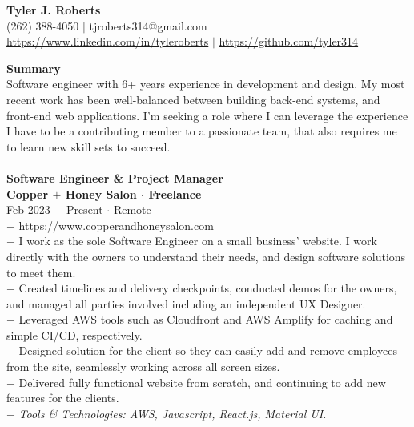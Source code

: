 \documentclass{resume}
\begin{document}
\begin{center}
{\LARGE \bf Tyler J. Roberts} \\[1mm]
\footnotesize
(262) 388-4050 $|$
tjroberts314@gmail.com \\[1mm]
\href{https://www.linkedin.com/in/tyleroberts}{https://www.linkedin.com/in/tyleroberts} $|$
\href{https://github.com/tyler314}{https://github.com/tyler314}
\end{center}
\begin{flushleft}

{\textbf{\large Summary}} \\
{
\footnotesize
\tab Software engineer with 6+ years experience in  development and design. My most recent work has been well-balanced between building back-end systems, and front-end  web applications. I'm seeking a role where I can leverage the experience I have to be a contributing member to a passionate team, that also requires me to learn new skill sets to succeed.
\\[4mm]
}
\\[2mm]

\normalsize{\bf Software Engineer \& Project Manager}\\
\footnotesize{\bf Copper $+$ Honey Salon $\cdot$ Freelance}\\
\footnotesize{Feb 2023 $-$ Present $\cdot$ Remote}\\[1mm]
{\scriptsize
	$-$ https://www.copperandhoneysalon.com\\
	$-$ I work as the sole Software Engineer on a small business' website. I work directly with the owners to understand their needs, and design software solutions to meet them.\\
	$-$ Created timelines and delivery checkpoints, conducted demos for the owners, and managed all parties involved including an independent UX Designer.\\
	$-$ Leveraged AWS tools such as Cloudfront and AWS Amplify for caching and simple CI/CD, respectively.\\
	$-$ Designed solution for the client so they can easily add and remove employees from the site, seamlessly working across all screen sizes.\\
	$-$ Delivered fully functional website from scratch, and continuing to add new features for the clients.\\
	$-$ \textit{Tools \& Technologies: AWS, Javascript, React.js, Material UI.}
}\\[3mm]


\end{flushleft}
\end{document}

